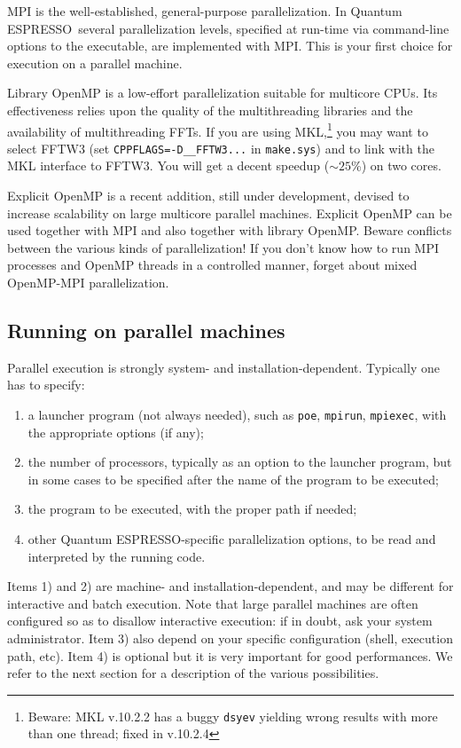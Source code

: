 \documentclass[12pt,a4paper]{article}
\def\qe{{\sc Quantum ESPRESSO}}
\begin{document}
MPI is the well-established, general-purpose parallelization.
In \qe\ several parallelization levels, specified at run-time
via command-line options to the executable, are implemented
with MPI. This is your first choice for execution on a parallel 
machine.

Library OpenMP is a low-effort parallelization suitable for
multicore CPUs. Its effectiveness relies upon the quality of 
the multithreading libraries and the availability of 
multithreading FFTs. If you are using MKL,\footnote{Beware: 
MKL v.10.2.2 has a buggy \texttt{dsyev} yielding wrong results 
with more than one thread; fixed in v.10.2.4}
you may want to select FFTW3 (set \texttt{CPPFLAGS=-D\_\_FFTW3...}
in \texttt{make.sys}) and to link with the MKL interface to FFTW3. 
You will get a decent speedup ($\sim 25$\%) on two cores.

Explicit OpenMP is a recent addition, still under
development, devised to increase scalability on
large multicore parallel machines. Explicit OpenMP can be used
together with MPI and also together with library OpenMP. Beware
conflicts between the various kinds of parallelization! 
If you don't know how to run MPI processes
and OpenMP threads in a controlled manner, forget about mixed 
OpenMP-MPI parallelization.

\subsection{Running on parallel machines}
\label{SubSec:para}

Parallel execution is strongly system- and installation-dependent. 
Typically one has to specify:
\begin{enumerate}
\item a launcher program (not always needed), 
such as \texttt{poe}, \texttt{mpirun}, \texttt{mpiexec},
  with the  appropriate options (if any);
\item the number of processors, typically as an option to the launcher
  program, but in some cases to be specified after the name of the
  program to be
  executed; 
\item the program to be executed, with the proper path if needed; 
\item other \qe-specific parallelization options, to be
  read and interpreted by the running code.
\end{enumerate}  
Items 1) and 2) are machine- and installation-dependent, and may be 
different for interactive and batch execution. Note that large
parallel machines are  often configured so as to disallow interactive
execution: if in doubt, ask your system administrator.
Item 3) also depend on your specific configuration (shell, execution path, etc). 
Item 4) is optional but it is very important
for good performances. We refer to the next
section for a description of the various 
possibilities.
\end{document}
